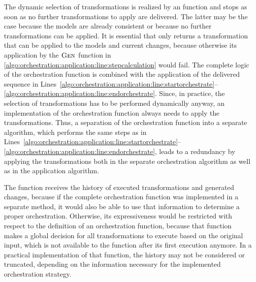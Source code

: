 The dynamic selection of transformations is realized by an  function and stops as soon as no further transformations to apply are delivered.
The latter may be the case because the models are already consistent or because no further transformations can be applied.
It is essential that  only returns a transformation that can be applied to the models and current changes, because otherwise its application by the $\textsc{Gen}_{}$ function in \autoref{algo:orchestration:application:line:stepcalculation} would fail.
The complete logic of the orchestration function is combined with the application of the delivered sequence in Lines~\ref{algo:orchestration:application:line:startorchestrate}--\ref{algo:orchestration:application:line:endorchestrate}.
Since, in practice, the selection of transformations has to be performed dynamically anyway, an implementation of the orchestration function always needs to apply the transformations.
Thus, a separation of the orchestration function into a separate algorithm, which performs the same steps as in Lines~\ref{algo:orchestration:application:line:startorchestrate}--\ref{algo:orchestration:application:line:endorchestrate}, leads to a redundancy by applying the transformations both in the separate orchestration algorithm as well as in the application algorithm.

The  function receives the history of executed transformations and generated changes, because if the complete orchestration function was implemented in a separate method, it would also be able to use that information to determine a proper orchestration.
Otherwise, its expressiveness would be restricted with respect to the definition of an orchestration function, because that function makes a global decision for all transformations to execute based on the original input, which is not available to the  function after its first execution anymore.
In a practical implementation of that function, the history may not be considered or truncated, depending on the information necessary for the implemented orchestration strategy.

